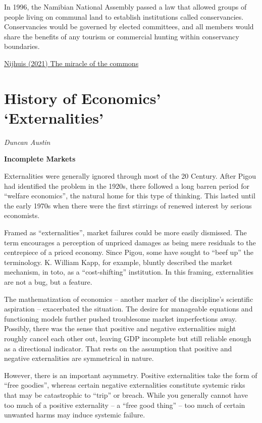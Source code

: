 \documentclass[
]{book}
\begin{document}
In 1996, the Namibian National Assembly passed a law that allowed groups of people living on communal land to establish institutions called conservancies. Conservancies would be governed by elected committees, and all members would share the benefits of any tourism or commercial hunting within conservancy boundaries.

\href{The\%20miracle\%20of\%20the\%20commons}{Nijhuis (2021) The miracle of the commons}

\hypertarget{history-of-economics-externalities}{%
\section{History of Economics' `Externalities'}\label{history-of-economics-externalities}}

\emph{Duncan Austin}

\textbf{Incomplete Markets}

Externalities were generally ignored through most of the 20 Century. After Pigou had
identified the problem in the 1920s, there followed a long barren period for ``welfare
economics'', the natural home for this type of thinking. This lasted until the early 1970s when there were the first stirrings of renewed interest by serious economists.

Framed as ``externalities'', market failures could be more easily dismissed.
The term encourages a perception of unpriced damages as
being mere residuals to the centrepiece of a priced economy.
Since Pigou, some have sought to ``beef up'' the terminology.
K. William Kapp, for example, bluntly described the market mechanism, in toto,
as a ``cost-shifting'' institution.
In this framing, externalities are not a bug, but a feature.

The mathematization of economics -- another marker of the discipline's
scientific aspiration -- exacerbated the situation.
The desire for manageable equations and functioning models
further pushed troublesome market imperfections away.
Possibly, there was the sense that positive and negative externalities
might roughly cancel each other out, leaving GDP incomplete
but still reliable enough as a directional indicator.
That rests on the assumption that positive and negative externalities are
symmetrical in nature.

However, there is an important asymmetry.
Positive externalities take the form of ``free goodies'', whereas certain negative externalities constitute systemic risks that
may be catastrophic to ``trip'' or breach. While you generally cannot have too much of a
positive externality -- a ``free good thing'' -- too much of certain unwanted harms may induce
systemic failure.
\end{document}
